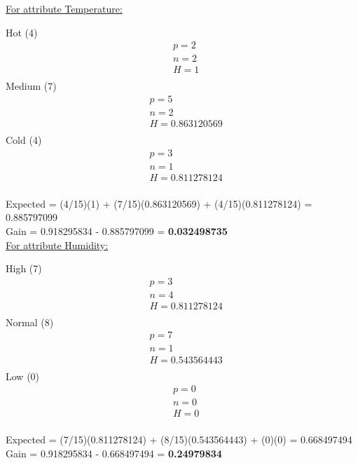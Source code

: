 \documentclass[8pt, fullpage,letterpaper]{article}
\begin{document}
\begin{enumerate}
\begin{enumerate}
\begin{enumerate}
\begin{enumerate}
\begin{itemize}
						\underline {For attribute Temperature:} 
							\vspace{-5pt}
							\begin{multicols}{3}
								Hot (4)
			 						\begin{align*}
									    	& p = 2\\
										& n = 2 \\
									    	& H = 1\\
								      \end{align*}
								Medium (7)
			 						\begin{align*}
									    	& p = 5\\
										& n = 2 \\
									    	& H = 0.863120569\\
								      \end{align*}
								Cold (4)
			 						\begin{align*}
									    	& p = 3\\
										& n = 1\\
									    	& H = 0.811278124\\
								      \end{align*}
							\end{multicols}
							\vspace{-20pt}
							Expected = (4/15)(1) + (7/15)(0.863120569) + (4/15)(0.811278124) = 0.885797099\\
							Gain = 0.918295834 - 0.885797099 = {\bf 0.032498735}\\

						\underline {For attribute Humidity:} 
							\vspace{-5pt}
							\begin{multicols}{3}
								High (7)
			 						\begin{align*}
									    	& p = 3\\
										& n = 4 \\
									    	& H = 0.811278124\\
								      \end{align*}
								Normal (8)
			 						\begin{align*}
									    	& p = 7\\
										& n = 1 \\
									    	& H = 0.543564443\\
								      \end{align*}
								Low (0)
			 						\begin{align*}
									    	& p = 0\\
										& n = 0 \\
									    	& H = 0\\
								      \end{align*}
							\end{multicols}
							\vspace{-20pt}
							Expected = (7/15)(0.811278124) + (8/15)(0.543564443) + (0)(0) = 0.668497494\\
							Gain = 0.918295834 - 0.668497494 = {\bf 0.24979834}\\


\end{itemize}
\end{enumerate}
\end{enumerate}
\end{enumerate}
\end{enumerate}
\end{document}
